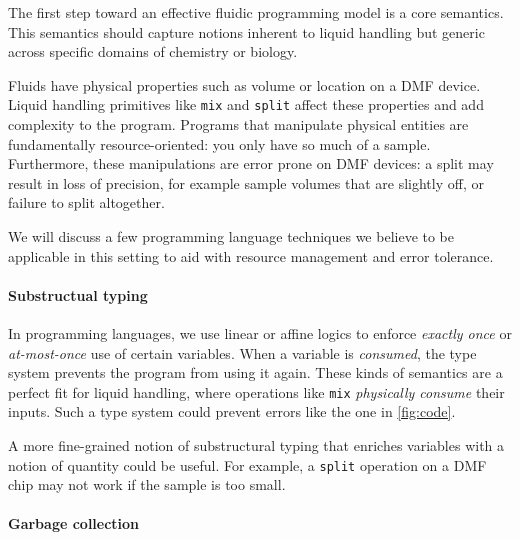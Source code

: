 \documentclass[
  10pt,
  a4paper,
  twocolumn,
]{article}
\begin{document}
The first step toward an effective fluidic programming model is a core semantics.
This semantics should capture notions inherent to liquid handling but generic across
specific domains of chemistry or biology.

Fluids have physical properties such as volume or location on a DMF device.
Liquid handling primitives like {\tt mix} and {\tt split} affect these properties and add complexity to the program.
Programs that manipulate physical entities are fundamentally resource-oriented: you only have so much of a sample.
Furthermore, these manipulations are error prone on DMF devices: a split may result in loss of precision, for example
sample volumes that are slightly off, or failure to split altogether.

We will discuss a few programming language techniques we believe to be applicable in this setting to aid with
resource management and error tolerance.


\paragraph{Substructual typing}

In programming languages, we use linear or affine logics to enforce \emph{exactly once} or \emph{at-most-once} use of certain variables. When a variable is \emph{consumed}, the type system prevents the program from using it again.
These kinds of semantics are a perfect fit for liquid handling, where operations like {\tt mix} \emph{physically consume}
their inputs. Such a type system could prevent errors like the one in \autoref{fig:code}.

A more fine-grained notion of substructural typing that enriches variables with a notion of quantity could be useful.
For example, a {\tt split} operation on a DMF chip may not work if the sample is too small.

\paragraph{Garbage collection}
\end{document}

